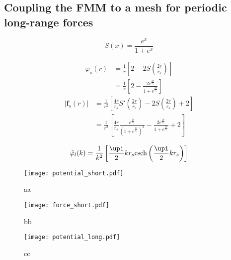 \subsection{Coupling the FMM to a mesh for periodic long-range forces}
\label{ssec:mesh_summary}

\begin{equation}
  S(x) = \frac{e^x}{1 + e^x}
\end{equation}

\begin{align}
  \varphi_s(r) &= \frac{1}{r}\left[2 - 2S\left(\frac{2r}{r_s}\right)\right] \nonumber\\
  &= \frac{1}{r}\left[2 - \frac{2e^{\frac{2r}{r_s}}}{1+e^{\frac{2r}{r_s}}}\right] 
\end{align}
\begin{align}
  |\mathbf{f}_s(r)| &= \frac{1}{r^2}\left[\frac{4r}{r_s}S'\left(\frac{2r}{r_s}\right) - 2S\left(\frac{2r}{r_s}\right) + 2\right] \nonumber \\
  &= \frac{1}{r^2}\left[\frac{4r}{r_s}\frac{e^{\frac{2r}{r_s}}}{(1+e^{\frac{2r}{r_s}})^2} - \frac{2e^{\frac{2r}{r_s}}}{1+e^{\frac{2r}{r_s}}} + 2\right]
\end{align}

\begin{equation}
  \tilde\varphi_l(k) = \frac{1}{k^2}\left[\frac{\upi}{2}kr_s\textrm{csch}\left(\frac{\upi}{2}kr_s\right) \right]
\end{equation}

\begin{figure}
\texttt{[image: potential\_short.pdf]}
\caption{aa}
\label{fig:fmm:potential_short}
\end{figure}


\begin{figure}
\texttt{[image: force\_short.pdf]}
\caption{bb}
\label{fig:fmm:force_short}
\end{figure}


\begin{figure}
\texttt{[image: potential\_long.pdf]}
\caption{cc}
\label{fig:fmm:potential_long}
\end{figure}
